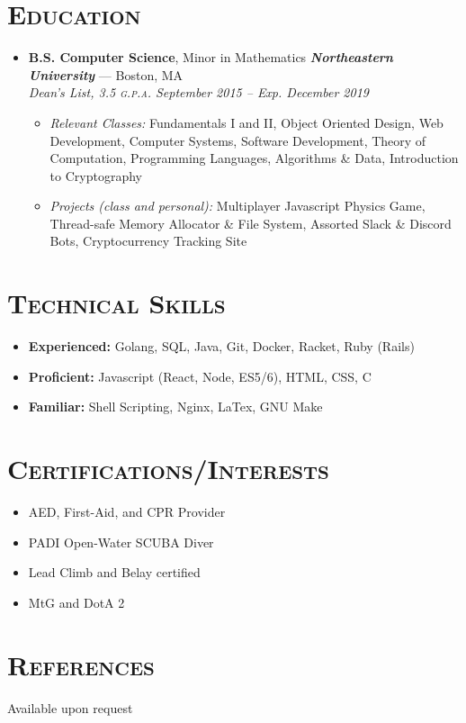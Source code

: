 \documentclass{article}
\begin{document}
\section*{\textsc{Education}}
\begin{itemize}[label={},leftmargin=*]
  \item \textbf{B.S. Computer Science}, Minor in Mathematics \hfill \textit{\textbf{Northeastern University}} --- Boston, MA \\
  \em{Dean's List}, 3.5 \textsc{g.p.a.}  \hfill \em{\textit{September 2015 -- Exp. December 2019}}
  \begin{itemize}
    \item[] \textit{Relevant Classes:} Fundamentals I and II, Object Oriented Design, Web Development, Computer Systems, Software Development, Theory of Computation, Programming Languages, Algorithms \& Data, Introduction to Cryptography\\
    \item[] \textit{Projects (class and personal):} Multiplayer Javascript Physics Game, Thread-safe Memory Allocator \& File System, Assorted Slack \& Discord Bots, Cryptocurrency Tracking Site
  \end{itemize}
\end{itemize}

\section*{\textsc{Technical Skills}}
\begin{itemize}[label={},leftmargin=*]
  \item \textbf{Experienced:} Golang, SQL, Java, Git, Docker, Racket, Ruby (Rails)
  \item \textbf{Proficient:} Javascript (React, Node, ES5/6), HTML, CSS, C
  \item \textbf{Familiar:} Shell Scripting, Nginx, LaTex, GNU Make
\end{itemize}

\section*{\textsc{Certifications/Interests}}
\begin{multicols}{2}
  \begin{itemize}[label={$\bullet$}]
    \item AED, First-Aid, and CPR Provider
    \item PADI Open-Water SCUBA Diver
    \item Lead Climb and Belay certified
    \item MtG and DotA 2
  \end{itemize}
\end{multicols}

\section*{\textsc{References}}
Available upon request
\end{document}
